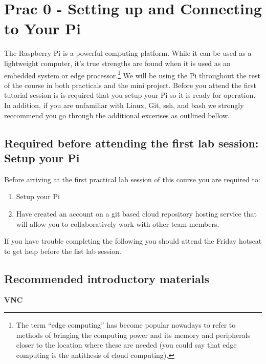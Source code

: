 \setcounter{section}{-1}
\section{Prac 0 - Setting up and Connecting to Your Pi}
The Raspberry Pi is a powerful computing platform. While it can be used as a lightweight computer, it's true strengths are found when it is used as an embedded system or edge processor.\footnote{The term “edge computing” has become popular nowadays to refer to methods of bringing the computing power and its memory and peripherals closer to the location where these are needed (you could say that edge computing is the antithesis of cloud computing).}  We will be using the Pi throughout the rest of the course in both practicals and the mini project.  Before you attend the first tutorial session is is required that you setup your Pi so it is ready for operation.  In addition, if you are unfamiliar with Linux, Git, ssh, and bash we strongly reccommend you go through the additional excerises as outlined bellow.

\subsection{Required before attending the first lab session: Setup your Pi }
Before arriving at the first practical lab session of this course you are required to:
\begin{enumerate}
    \item Setup your Pi
    \item Have created an account on a git based cloud repository hosting service that will allow you to collaboratively work with other team members.
\end{enumerate}

If you have trouble completing the following you should attend the Friday hotseat to get help before the fist lab session.




\subsection{Recommended introductory materials}

\textbf{VNC}